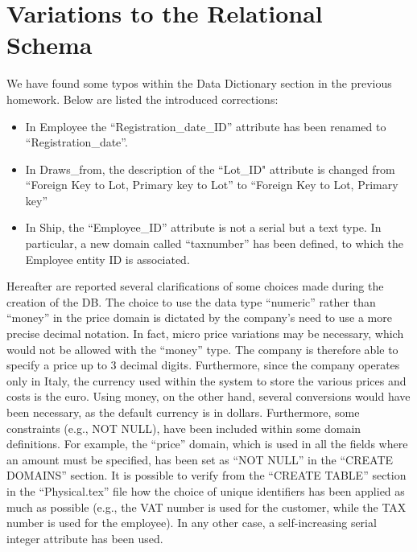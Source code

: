 \section{Variations to the Relational Schema}


We have found some typos within the Data Dictionary section in the previous homework. Below are listed the introduced corrections:
\begin{itemize}
	\item In Employee the ``Registration\_date\_ID'' attribute has been renamed to ``Registration\_date''.
	\item In Draws\_from, the description of the ``Lot\_ID" attribute is changed from ``Foreign Key to Lot, Primary key to Lot'' to ``Foreign Key to Lot, Primary key''
	\item In Ship, the ``Employee\_ID'' attribute is not a serial but a text type. In particular, a new domain called ``taxnumber'' has been defined, to which the Employee entity ID is associated.
\end{itemize}

\noindent Hereafter are reported several clarifications of some choices made during the creation of the DB. The choice to use the data type ``numeric'' rather than ``money'' in the price domain is dictated by the company's need to use a more precise decimal notation. In fact, micro price variations may be necessary, which would not be allowed with the ``money'' type. The company is therefore able to specify a price up to 3 decimal digits. Furthermore, since the company operates only in Italy, the currency used within the system to store the various prices and costs is the euro. Using money, on the other hand, several conversions would have been necessary, as the default currency is in dollars. Furthermore, some constraints (e.g., NOT NULL), have been included within some domain definitions. For example, the ``price'' domain, which is used in all the fields where an amount must be specified, has been set as ``NOT NULL'' in the ``CREATE DOMAINS'' section. It is possible to verify from the ``CREATE TABLE'' section in the ``Physical.tex'' file how the choice of unique identifiers has been applied as much as possible (e.g., the VAT number is used for the customer, while the TAX number is used for the employee). In any other case, a self-increasing serial integer attribute has been used.